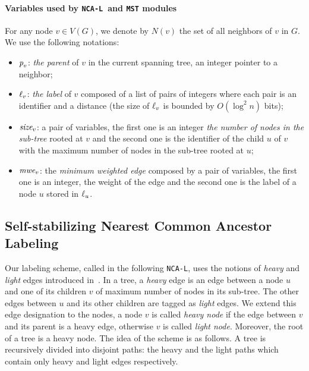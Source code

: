 \documentclass[11pt,a4paper]{article}
\newcommand{\parent}{\mbox{\it p}}
\newcommand{\lab}{\mbox{\rm $\ell$}}
\newcommand{\TS}{\mbox{\it size}}
\newcommand{\m}{\mbox{\it mwe}}
\newcommand{\MST}{\mbox{\tt MST}}
\newcommand{\LabA}{\mbox{\tt NCA-L}}
\begin{document}
\paragraph{Variables used by \LabA\ and \MST\/ modules}
For any node $v \in V(G)$, we denote by $N(v)$ the set of all neighbors of $v$ in $G$. 
We use the following notations: 
\begin{itemize}
\item $\parent_v$: \textit{the parent} of $v$ in the current spanning tree, an integer pointer to a neighbor;\item $\lab_v$: \textit{the label} of $v$ composed of a list of pairs of integers where each pair is an identifier and a distance (the size of $\lab_v$ is bounded by $O(\log^2 n)$ bits);\item $\TS_v$: a pair of variables, the first one is an integer \textit{the number of nodes in the sub-tree} rooted at $v$ and the second one is the identifier of the child $u$ of $v$ with the maximum number of nodes in the sub-tree rooted at $u$;\item $\m_v$: the \textit{minimum weighted edge} composed by a pair of variables, the first one is an integer, the weight of the edge and the second one is the label of a node $u$ stored in $\lab_u$.
\end{itemize}


\subsection{Self-stabilizing Nearest Common Ancestor Labeling}
\label{sec:label}
Our labeling scheme, called in the following \LabA, uses the 
notions of \textit{heavy} and \textit{light} edges 
introduced in~\cite{HT84j}. 
In a tree, a \textit{heavy} edge is an edge between a node $u$ and one of its children $v$ of maximum number of nodes 
in its sub-tree. The other edges between $u$ and its other children are tagged as \textit{light} edges. We extend this edge designation to the nodes, a node $v$ is called \emph{heavy node} if the edge between $v$ and its parent is a heavy edge, otherwise $v$ is called \emph{light node}. Moreover, the root of a tree is a heavy node.
The idea of the scheme is as follows. A tree is recursively 
divided into disjoint paths: the heavy and the light paths which contain only heavy and light edges respectively.
\end{document}
